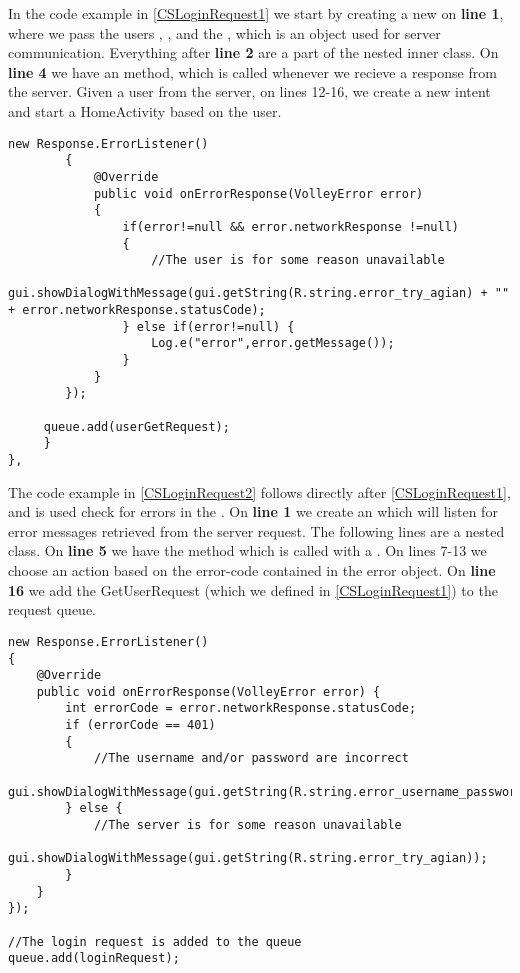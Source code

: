 In the code example in \autoref{CSLoginRequest1} we start by creating a new
 on \textbf{line 1}, where we pass the users
, , and the , which is
an object used for server communication. Everything after \textbf{line 2} are
a part of the  nested inner class. On \textbf{line 4} we
have an  method, which is called whenever we recieve a
response from the server. Given a user from the server, on lines 12-16, we
create a new intent and start a HomeActivity based on the user.\nl

\begin{minipage}[H]{\linewidth}
\begin{lstlisting}[caption = Using an errorListener to detect mishaps in the GetUserRequest, label = CSLoginRequest2]
        new Response.ErrorListener() 
        {
        	@Override
            public void onErrorResponse(VolleyError error) 
            {
            	if(error!=null && error.networkResponse !=null) 
            	{
            		//The user is for some reason unavailable
            	     gui.showDialogWithMessage(gui.getString(R.string.error_try_agian) + "" + error.networkResponse.statusCode);
                } else if(error!=null) {
                	Log.e("error",error.getMessage());
                }
            }
        });
        
     queue.add(userGetRequest);
     }
},
\end{lstlisting}
\end{minipage}

The code example in \autoref{CSLoginRequest2} follows directly after
\autoref{CSLoginRequest1}, and is used check for errors in the
. On \textbf{line 1} we create an 
which will listen for error messages retrieved from the server request. The
following lines are a nested class. On \textbf{line 5} we have the
 method which is called with a . On
lines {7-13} we choose an action based on the error-code contained in the error
object. On \textbf{line 16} we add the GetUserRequest (which we defined in
\autoref{CSLoginRequest1}) to the request queue.\nl

\begin{minipage}[H]{\linewidth}
\begin{lstlisting}[caption = Using an errorListener to detect mishaps in the LoginRequest, label = CSLoginRequest3] 
new Response.ErrorListener() 
{
	@Override
    public void onErrorResponse(VolleyError error) {
        int errorCode = error.networkResponse.statusCode;
        if (errorCode == 401) 
        {
        	//The username and/or password are incorrect
            gui.showDialogWithMessage(gui.getString(R.string.error_username_password));
        } else {
            //The server is for some reason unavailable
            gui.showDialogWithMessage(gui.getString(R.string.error_try_agian));
        }
    }
});

//The login request is added to the queue
queue.add(loginRequest);
\end{lstlisting}
\end{minipage}

